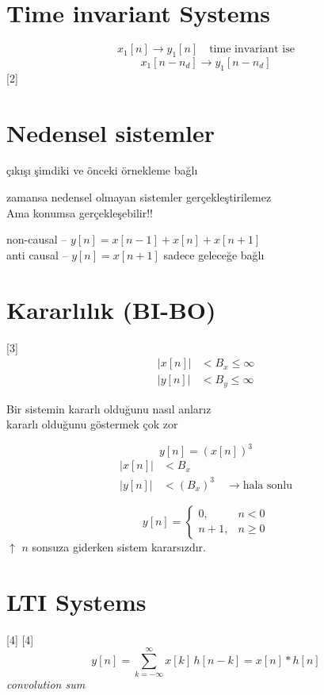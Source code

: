 \documentclass[11pt,a4paper]{article}
\begin{document}
\section{Time invariant Systems}
\[ x_1[n]\rightarrow y_1[n] \quad \text{time invariant ise} \]
\[ x_1[n-n_d]\rightarrow y_1[n-n_d] \]
[2]

\section{Nedensel sistemler}
çıkışı şimdiki ve önceki örnekleme bağlı

zamansa nedensel olmayan sistemler gerçekleştirilemez\\
Ama konumsa gerçekleşebilir!!

non-causal -- $y[n]=x[n-1]+x[n]+x[n+1]$\\
anti causal -- $y[n]=x[n+1]$ \quad sadece geleceğe bağlı

\section{Kararlılık (BI-BO)}
[3]
\begin{align*}
|x[n]| &< B_x \le \infty\\
|y[n]| &< B_y \le \infty
\end{align*}

Bir sistemin kararlı olduğunu nasıl anlarız\\
kararlı olduğunu göstermek çok zor

\[ y[n]=(x[n])^3 \]
\begin{align*}
|x[n]| &< B_x\\
|y[n]| &< (B_x)^3 \quad \rightarrow \text{hala sonlu}
\end{align*}

\[ y[n]=\begin{cases} 0, & n<0\\ n+1, & n\ge 0 \end{cases} \]
$\uparrow$ $n$ sonsuza giderken sistem kararsızdır.

\section{LTI Systems}
[4]
[4]
\[ y[n]=\sum_{k=-\infty}^{\infty} x[k]\,h[n-k] = x[n]*h[n] \]
\textit{convolution sum}
\end{document}
